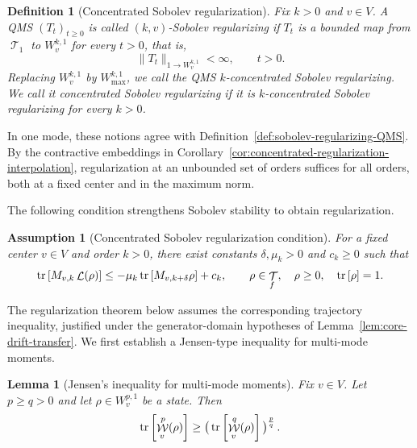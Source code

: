 \documentclass[11pt]{article}
\theoremstyle{myplain}
\newtheorem{lem}[lem]{Lemma}
\newtheorem{regularizationassum}{Assumption}
\theoremstyle{mydefinition}
\newtheorem{defi}[defi]{Definition}
\theoremstyle{remark}
\DeclareMathOperator{\cL}{\mathcal{L}}
\DeclareMathOperator{\cT}{\mathcal{T}}
\DeclareMathOperator{\cW}{\mathcal{W}}
\DeclareMathOperator{\1}{\mathds{1}}
\newcommand{\tr}[1][]{\operatorname{tr}%
  \ifx#1\empty \else \left[ #1 \right] \fi}
\begin{document}
        
        \begin{defi}[Concentrated Sobolev regularization]\label{def:concentrated-sobolev-regularizing-QMS}
            Fix $k > 0$ and $v \in V$. A QMS $(T_t)_{t \geq 0}$ is called \emph{$(k,v)$-Sobolev regularizing} if $T_t$ is a bounded map from $\cT_1$ to $W_v^{k,1}$ for every $t > 0$, that is,
            \begin{equation}\label{eq:concentrated-sobolev-regularizing}
                \|T_t\|_{1 \to W_v^{k,1}} < \infty,\qquad t > 0.
            \end{equation}
            Replacing $W_v^{k,1}$ by $W_{\max}^{k,1}$, we call the QMS \emph{$k$-concentrated Sobolev regularizing}. We call it \emph{concentrated Sobolev regularizing} if it is $k$-concentrated Sobolev regularizing for every $k > 0$.
        \end{defi}
        In one mode, these notions agree with Definition~\ref{def:sobolev-regularizing-QMS}. By the contractive embeddings in Corollary~\ref{cor:concentrated-regularization-interpolation}, regularization at an unbounded set of orders suffices for all orders, both at a fixed center and in the maximum norm.

        The following condition strengthens Sobolev stability to obtain regularization.
        \begin{regularizationassum}[Concentrated Sobolev regularization condition]\label{assum:concentrated-regularization}
            For a fixed center $v \in V$ and order $k > 0$, there exist constants $\delta,\mu_k > 0$ and $c_k \geq 0$ such that
            \begin{equation}\label{eq:strong-concentrated-core-drift}
                \tr[M_{v,k}\cL(\rho)]
                \leq -\mu_k \tr[M_{v,k+\delta}\rho]
                + c_k,
                \qquad \rho \in \cT_f,\quad \rho \geq 0,\quad \tr[\rho] = 1.
            \end{equation}
        \end{regularizationassum}
        The regularization theorem below assumes the corresponding trajectory inequality, justified under the generator-domain hypotheses of Lemma~\ref{lem:core-drift-transfer}. We first establish a Jensen-type inequality for multi-mode moments.
        

        \begin{lem}[Jensen's inequality for multi-mode moments]\label{lem:jensens-inequality-moments-number-operator-multi}
            Fix $v\in V$. Let $p\geq q>0$ and let $\rho\in W_v^{p,1}$ be a state. Then
            \begin{equation}\label{eq:multi-jensen-moment}
                \tr[\cW_v^{p} (\rho) ]\geq \big( \tr[\cW_v^{q} (\rho) ] \big)^{\frac{p}{q}}\,.
            \end{equation}
        \end{lem}
\end{document}
